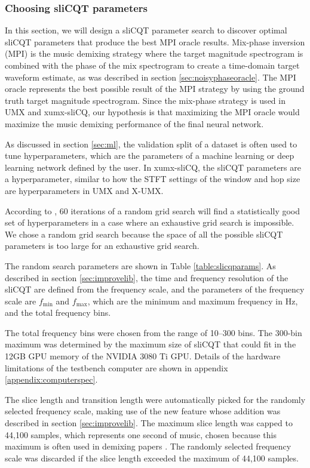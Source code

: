 \documentclass[report.tex]{subfiles}
\begin{document}
\newpagefill

\subsubsection{Choosing sliCQT parameters}
\label{sec:slicqparamsrch}

In this section, we will design a sliCQT parameter search to discover optimal sliCQT parameters that produce the best MPI oracle results. Mix-phase inversion (MPI) is the music demixing strategy where the target magnitude spectrogram is combined with the phase of the mix spectrogram to create a time-domain target waveform estimate, as was described in section \ref{sec:noisyphaseoracle}. The MPI oracle represents the best possible result of the MPI strategy by using the ground truth target magnitude spectrogram. Since the mix-phase strategy is used in UMX and xumx-sliCQ, our hypothesis is that maximizing the MPI oracle would maximize the music demixing performance of the final neural network.

As discussed in section \ref{sec:ml}, the validation split of a dataset is often used to tune hyperparameters, which are the parameters of a machine learning or deep learning network defined by the user. In xumx-sliCQ, the sliCQT parameters are a hyperparameter, similar to how the STFT settings of the window and hop size are hyperparameters in UMX and X-UMX.

According to \textcite{randomgrid}, 60 iterations of a random grid search will find a statistically good set of hyperparameters in a case where an exhaustive grid search is impossible. We chose a random grid search because the space of all the possible sliCQT parameters is too large for an exhaustive grid search.

The random search parameters are shown in Table \ref{table:slicqparams}. As described in section \ref{sec:improvelib}, the time and frequency resolution of the sliCQT are defined from the frequency scale, and the parameters of the frequency scale are $f_{\text{min}}$ and $f_{\text{max}}$, which are the minimum and maximum frequency in Hz, and the total frequency bins.

The total frequency bins were chosen from the range of 10--300 bins. The 300-bin maximum was determined by the maximum size of sliCQT that could fit in the 12GB GPU memory of the NVIDIA 3080 Ti GPU. Details of the hardware limitations of the testbench computer are shown in appendix \ref{appendix:computerspec}.

The slice length and transition length were automatically picked for the randomly selected frequency scale, making use of the new feature whose addition was described in section \ref{sec:improvelib}. The maximum slice length was capped to 44,100 samples, which represents one second of music, chosen because this maximum is often used in demixing papers \parencite{plumbley1, plumbley2, demucs}. The randomly selected frequency scale was discarded if the slice length exceeded the maximum of 44,100 samples.
\end{document}
